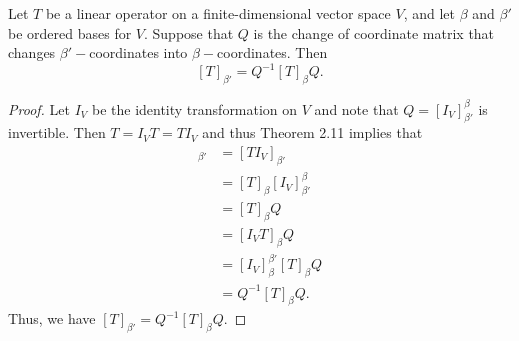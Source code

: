 \begin{theorem}\label{Theorem 2.23}
   Let \( T  \) be a linear operator on a finite-dimensional vector space \( V  \), and let \( \beta \) and \( \beta'  \) be ordered bases for \( V  \). Suppose that \( Q  \) is the change of coordinate matrix that changes \( \beta' - \)coordinates into \( \beta- \)coordinates. Then  
   \[  [T]_{\beta'} = Q^{-1} [T]_{\beta} Q. \]
\end{theorem}
\begin{proof}
Let \( {I}_{V}  \) be the identity transformation on \( V  \) and note that \( Q = [{I}_{V}]_{\beta'}^{\beta}  \) is invertible. Then \( T = {I}_{V}T = T {I}_{V}  \) and thus Theorem 2.11 implies that
\begin{align*}
    [T]_{\beta'} &= [T {I}_{V}]_{\beta'} \\
                 &=  [T]_{\beta} [{I}_{V}]_{\beta'}^{\beta}  \\
                 &= [T]_{\beta} Q \\
                 &= [{I}_{V} T ]_{\beta} Q \\
                 &= [{I}_{V}]_{\beta}^{\beta'} [T]_{\beta} Q  \\
                 &= Q^{-1} [T]_{\beta} Q.
\end{align*}
Thus, we have \( [T]_{\beta'} = Q^{-1} [T]_{\beta} Q \).
\end{proof}

